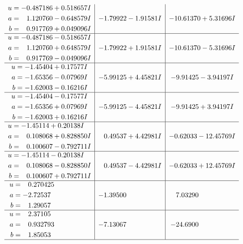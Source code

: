 \documentclass[1p]{elsarticle_modified}
\theoremstyle{definition}
\begin{document}
$$\begin{array}{c|c|c}
\begin{aligned}
u &= -0.487186 + 0.518657 I \\
a &= \phantom{-}1.120760 - 0.648579 I \\
b &= \phantom{-}0.917769 + 0.049096 I\end{aligned}
 & -1.79922 - 1.91581 I & -10.61370 + 5.31696 I \\ \hline\begin{aligned}
u &= -0.487186 - 0.518657 I \\
a &= \phantom{-}1.120760 + 0.648579 I \\
b &= \phantom{-}0.917769 - 0.049096 I\end{aligned}
 & -1.79922 + 1.91581 I & -10.61370 - 5.31696 I \\ \hline\begin{aligned}
u &= -1.45404 + 0.17577 I \\
a &= -1.65356 - 0.07969 I \\
b &= -1.62003 - 0.16216 I\end{aligned}
 & -5.99125 + 4.45821 I & -9.91425 - 3.94197 I \\ \hline\begin{aligned}
u &= -1.45404 - 0.17577 I \\
a &= -1.65356 + 0.07969 I \\
b &= -1.62003 + 0.16216 I\end{aligned}
 & -5.99125 - 4.45821 I & -9.91425 + 3.94197 I \\ \hline\begin{aligned}
u &= -1.45114 + 0.20138 I \\
a &= \phantom{-}0.108068 + 0.828850 I \\
b &= \phantom{-}0.100607 - 0.792711 I\end{aligned}
 & \phantom{-}0.49537 + 4.42981 I & -0.62033 - 12.45769 I \\ \hline\begin{aligned}
u &= -1.45114 - 0.20138 I \\
a &= \phantom{-}0.108068 - 0.828850 I \\
b &= \phantom{-}0.100607 + 0.792711 I\end{aligned}
 & \phantom{-}0.49537 - 4.42981 I & -0.62033 + 12.45769 I \\ \hline\begin{aligned}
u &= \phantom{-}0.270425\phantom{ +0.000000I} \\
a &= -2.72537\phantom{ +0.000000I} \\
b &= \phantom{-}1.29057\phantom{ +0.000000I}\end{aligned}
 & -1.39500\phantom{ +0.000000I} & \phantom{-}7.03290\phantom{ +0.000000I} \\ \hline\begin{aligned}
u &= \phantom{-}2.37105\phantom{ +0.000000I} \\
a &= \phantom{-}0.932793\phantom{ +0.000000I} \\
b &= \phantom{-}1.85053\phantom{ +0.000000I}\end{aligned}
 & -7.13067\phantom{ +0.000000I} & -24.6900\phantom{ +0.000000I}\\
 \hline 
 \end{array}$$\newpage
\end{document}

